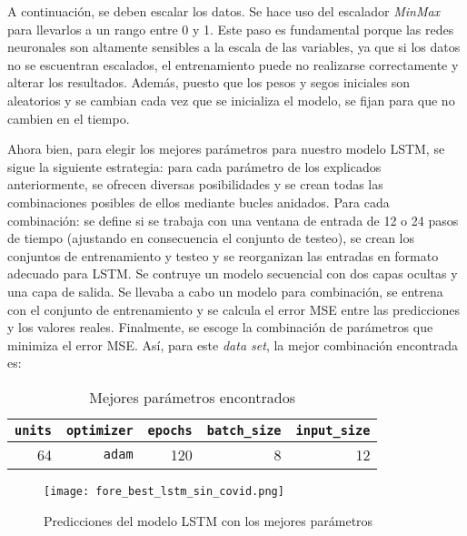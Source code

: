 \documentclass[12pt,twoside]{article}
\begin{document}
A continuación, se deben escalar los datos. Se hace uso del escalador \textit{MinMax} para llevarlos a un rango entre 0 y 1. Este paso es fundamental porque las redes neuronales son altamente sensibles a la escala de las variables, ya que si los datos no se escuentran escalados, el entrenamiento puede no realizarse correctamente y alterar los resultados. Además, puesto que los pesos y segos iniciales son aleatorios y se cambian cada vez que se inicializa el modelo, se fijan para que no cambien en el tiempo.

Ahora bien, para elegir los mejores parámetros para nuestro modelo LSTM, se sigue la siguiente estrategia: para cada parámetro de los explicados anteriormente, se ofrecen diversas posibilidades y se crean todas las combinaciones posibles de ellos mediante bucles anidados. Para cada combinación: se define si se trabaja con una ventana de entrada de 12 o 24 pasos de tiempo (ajustando en consecuencia el conjunto de testeo), se crean los conjuntos de entrenamiento y testeo y se reorganizan las entradas en formato adecuado para LSTM. Se contruye un modelo secuencial con dos capas ocultas y una capa de salida. Se llevaba a cabo un modelo para combinación, se entrena con el conjunto de entrenamiento y se calcula el error MSE entre las predicciones y los valores reales. Finalmente, se escoge la combinación de parámetros que minimiza el error MSE. Así, para este \textit{data set}, la mejor combinación encontrada es:

\begin{table}[ht] 
\centering
\begin{tabular}{rrrrr} 
  \hline
 \texttt{units} & \texttt{optimizer} & \texttt{epochs} & \texttt{batch\_size} & \texttt{input\_size} \\ 
  \hline
64 & \texttt{adam} & 120 & 8 & 12 \\ 
   \hline
\end{tabular}
\caption{Mejores parámetros encontrados} \label{tab:01}
\end{table}

\begin{figure}[h]
    \centering
    \texttt{[image: fore\_best\_lstm\_sin\_covid.png]}
    \caption{Predicciones del modelo LSTM con los mejores parámetros} 
    \label{fig:fig15}
\end{figure}

\end{document}
